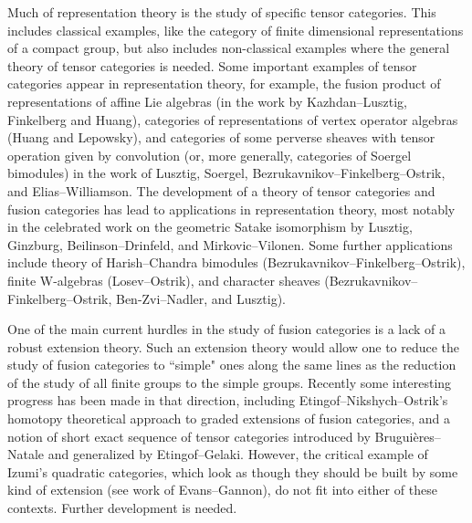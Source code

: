 \documentclass[12pt]{article}
\begin{document}
Much of representation theory is the study of specific tensor categories. This includes classical examples, like the category of finite dimensional representations of a compact group, but also includes non-classical examples where the general theory of tensor categories is needed.  Some important examples of tensor categories appear in representation theory, for example, the fusion product of representations of affine Lie algebras (in the work by Kazhdan--Lusztig, Finkelberg and Huang), categories of representations of vertex operator algebras (Huang and Lepowsky), and categories of some perverse sheaves with tensor operation given by convolution (or, more generally, categories of Soergel bimodules) in the work of Lusztig, Soergel, Bezrukavnikov--Finkelberg--Ostrik, and Elias--Williamson. The development of a theory of tensor categories and fusion categories has lead to applications in representation theory, most notably in the celebrated work on the geometric Satake isomorphism by Lusztig, Ginzburg, Beilinson--Drinfeld, and Mirkovic--Vilonen. Some further applications include theory of Harish--Chandra bimodules (Bezrukavnikov--Finkelberg--Ostrik), finite W-algebras (Losev--Ostrik), and character sheaves (Bezrukavnikov--Finkelberg--Ostrik, Ben-Zvi--Nadler, and Lusztig).


One of the main current hurdles in the study of fusion categories is a lack of a robust extension theory. Such an extension theory would allow one to reduce the study of fusion categories to ``simple" ones along the same lines as the reduction of the study of all finite groups to the simple groups. Recently some interesting progress has been made in that direction, including Etingof--Nikshych--Ostrik's homotopy theoretical approach to graded extensions of fusion categories, and a notion of short exact sequence of tensor categories introduced by Brugui\`eres--Natale and generalized by Etingof--Gelaki. However, the critical example of Izumi's quadratic categories, which look as though they should be built by some kind of extension (see work of Evans--Gannon), do not fit into either of these contexts. Further development is needed.
\end{document}
